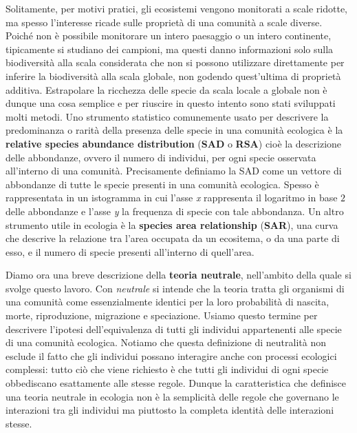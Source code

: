 Solitamente, per motivi pratici, gli ecosistemi vengono monitorati a scale ridotte, ma spesso l'interesse ricade sulle proprietà di una comunità a scale diverse.
Poiché non è possibile monitorare un intero paesaggio o un intero continente, tipicamente si studiano dei campioni, ma questi danno informazioni solo sulla biodiversità alla scala considerata che non si possono utilizzare direttamente per inferire la biodiversità alla scala globale, non godendo quest'ultima di proprietà additiva. Estrapolare la ricchezza delle specie da scala locale a globale non è dunque una cosa semplice e per riuscire in questo intento sono stati sviluppati molti metodi. Uno strumento statistico comunemente usato per descrivere la predominanza o rarità della presenza delle specie in una comunità ecologica è la \textbf{relative species abundance distribution} (\textbf{SAD} o \textbf{RSA}) cioè la descrizione delle abbondanze, ovvero il numero di individui, per ogni specie osservata all'interno di una comunità\cite{doi:McGill2007}. Precisamente definiamo la SAD come un vettore di abbondanze di tutte le specie presenti in una comunità ecologica. Spesso è rappresentata in un istogramma in cui l'asse \emph{x} rappresenta il logaritmo in base $2$ delle abbondanze e l'asse \emph{y} la frequenza di specie con tale abbondanza\cite{Preston}. Un altro strumento utile in ecologia è la \textbf{species area relationship} (\textbf{SAR}), una curva che descrive la relazione tra l'area occupata da un ecositema, o da una parte di esso, e il numero di specie presenti all'interno di quell'area.

Diamo ora una breve descrizione della \textbf{teoria neutrale}, nell'ambito della quale si svolge questo lavoro\cite{Hubbell}. Con \emph{neutrale} si intende che la teoria tratta gli organismi di una comunità come essenzialmente identici per la loro probabilità di nascita, morte, riproduzione, migrazione e speciazione. Usiamo questo termine per descrivere l'ipotesi dell'equivalenza di tutti gli individui appartenenti alle specie di una comunità ecologica. Notiamo che questa definizione di neutralità non esclude il fatto che gli individui possano interagire anche con processi ecologici complessi: tutto ciò che viene richiesto è che tutti gli individui di ogni specie obbediscano esattamente alle stesse regole. Dunque la caratteristica che definisce una teoria neutrale in ecologia non è la semplicità delle regole che governano le interazioni tra gli individui ma piuttosto la completa identità delle interazioni stesse.



